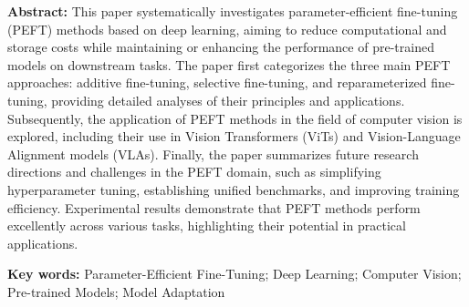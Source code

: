 \documentclass[12pt,a4paper,twoside]{article} %
\begin{document}
\noindent
\textbf{Abstract:} This paper systematically investigates parameter-efficient fine-tuning (PEFT) methods based on deep learning, aiming to reduce computational and storage costs while maintaining or enhancing the performance of pre-trained models on downstream tasks. The paper first categorizes the three main PEFT approaches: additive fine-tuning, selective fine-tuning, and reparameterized fine-tuning, providing detailed analyses of their principles and applications. Subsequently, the application of PEFT methods in the field of computer vision is explored, including their use in Vision Transformers (ViTs) and Vision-Language Alignment models (VLAs). Finally, the paper summarizes future research directions and challenges in the PEFT domain, such as simplifying hyperparameter tuning, establishing unified benchmarks, and improving training efficiency. Experimental results demonstrate that PEFT methods perform excellently across various tasks, highlighting their potential in practical applications.

\noindent
\textbf{Key words:} Parameter-Efficient Fine-Tuning; Deep Learning; Computer Vision; Pre-trained Models; Model Adaptation


\end{document}
